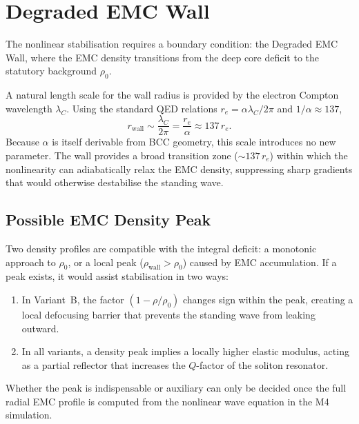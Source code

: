 \documentclass[11pt,a4paper]{article}
\begin{document}
	\section{Degraded EMC Wall}
	
	The nonlinear stabilisation requires a boundary condition: the
	Degraded EMC Wall, where the EMC density transitions from the deep
	core deficit to the statutory background $\rho_{0}$.
	
	A natural length scale for the wall radius is provided by the
	electron Compton wavelength $\lambda_C$.  Using the standard QED
	relations $r_e = \alpha\lambda_C/2\pi$ and $1/\alpha \approx 137$,
	\begin{equation}\label{eq:rwall}
		\boxed{r_{\text{wall}} \sim \frac{\lambda_C}{2\pi}
			= \frac{r_e}{\alpha} \approx 137\,r_e} .
	\end{equation}
	Because $\alpha$ is itself derivable from BCC geometry, this scale
	introduces no new parameter.  The wall provides a broad transition
	zone ($\sim 137\,r_e$) within which the nonlinearity can adiabatically
	relax the EMC density, suppressing sharp gradients that would
	otherwise destabilise the standing wave.
	
	\subsection*{Possible EMC Density Peak}
	
	Two density profiles are compatible with the integral deficit: a
	monotonic approach to $\rho_{0}$, or a local peak
	($\rho_{\text{wall}} > \rho_{0}$) caused by EMC accumulation.  If a
	peak exists, it would assist stabilisation in two ways:
	\begin{enumerate}
		\item In Variant~B, the factor $(1-\rho/\rho_{0})$ changes sign
		within the peak, creating a local defocusing barrier that
		prevents the standing wave from leaking outward.
		\item In all variants, a density peak implies a locally higher
		elastic modulus, acting as a partial reflector that increases
		the $Q$-factor of the soliton resonator.
	\end{enumerate}
	Whether the peak is indispensable or auxiliary can only be decided
	once the full radial EMC profile is computed from the nonlinear wave
	equation in the M4 simulation.
	
\end{document}
